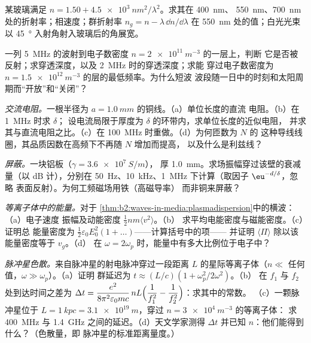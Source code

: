 \begin{exercise}[$\star$]\label{exo:b2:waves-in-media:3}
某玻璃满足 $n = 1.50 + \qty{4.5e3}{nm^2}/\lambda^2$。求其在 \qty{400}{nm}、
\qty{550}{nm}、\qty{700}{nm} 处的折射率；相速度；群折射率 $n_g = n -
\lambda\,\dd n/\dd\lambda$ 在 \qty{550}{nm} 处的值；白光光束
以 \qty{45}{\degree} 入射角射入玻璃后的角展宽。
\end{exercise}

\begin{exercise}[$\star$]\label{exo:b2:waves-in-media:4}
一列 \qty{5}{MHz} 的波射到电子数密度 $n = \qty{2e11}{m^{-3}}$ 的一层上，判断
它是否被反射；求穿透深度，以及 \qty{2}{MHz} 时的穿透深度；求能
穿过电子数密度为 $n = \qty{1.5e12}{m^{-3}}$ 的层的最低频率。为什么短波
波段随一日中的时刻和太阳周期而“开放”和“关闭”？
\end{exercise}

\begin{exercise}[$\star\star$]\label{exo:b2:waves-in-media:5}
\emph{交流电阻。}一根半径为 $a = \qty{1.0}{mm}$ 的铜线。（a）单位长度的直流
电阻。（b）在 \qty{1}{MHz} 时求 $\delta$；
设电流局限于厚度为 $\delta$ 的环带内，求单位长度的近似电阻，
并求其与直流电阻之比。（c）在 \qty{100}{MHz} 时重做。（d）为何匝数为 $N$ 的
这种导线线圈，其品质因数在高频下不再随 $N$ 增加而提高，
以及什么是利兹线？
\end{exercise}

\begin{exercise}[$\star\star$]\label{exo:b2:waves-in-media:6}
\emph{屏蔽。}一块铝板（$\gamma = \qty{3.6e7}{S/m}$），
厚 \qty{1.0}{mm}。求场振幅穿过该壁的衰减量（以 dB 计），分别在
\qty{50}{Hz}、\qty{10}{kHz}、\qty{1}{MHz} 下计算（取因子 $\eu^{-d/\delta}$，忽略
表面反射）。为何工频磁场用铁（高磁导率）
而非铜来屏蔽？
\end{exercise}

\begin{exercise}[$\star\star$]\label{exo:b2:waves-in-media:7}
\emph{等离子体中的能量。}对于
\cref{thm:b2:waves-in-media:plasmadispersion}中的横波：（a）电子速度
振幅及动能密度 $\tfrac12nm\langle v^2\rangle$。（b）
求平均电能密度与磁能密度。（c）证明总
能量密度为 $\tfrac12\varepsilon_0E_0^2(1 + \dots)$——计算括号中的项——
并证明 $\langle\Pi\rangle$ 除以该能量密度等于 $v_g$。（d）
在 $\omega = 2\omega_p$ 时，能量中有多大比例位于电子中？
\end{exercise}

\begin{exercise}[$\star\star$]\label{exo:b2:waves-in-media:8}
\emph{脉冲星色散。}来自脉冲星的射电脉冲穿过一段距离
$L$ 的星际等离子体（$n \ll$ 任何值，$\omega \gg \omega_p$）。（a）证明
群延迟为 $t \approx (L/c)(1 + \omega_p^2/2\omega^2)$。（b）
在 $f_1$ 与 $f_2$ 处到达时间之差为 $\Delta t = \dfrac{e^2}{8\pi^2
\varepsilon_0mc}\,nL\Bigl(\dfrac1{f_1^2} - \dfrac1{f_2^2}\Bigr)$：求其中的常数。
（c）一颗脉冲星位于 $L = \qty{1}{kpc} = \qty{3.1e19}{m}$，穿过 $n = \qty{3e4}{m^{-3}}$ 的等离子体：
求 \qty{400}{MHz} 与 \qty{1.4}{GHz} 之间的延迟。（d）天文学家测得
$\Delta t$ 并已知 $n$：他们能得到什么？（色散量，即
脉冲星的标准距离量度。）
\end{exercise}


